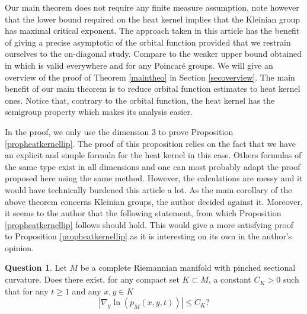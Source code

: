 \documentclass[JEP,XML,SOM,Unicode,NoFloatCountersInSection,published]{cedram}
\theoremstyle{plain}
\theoremstyle{definition}
\newtheorem*{question}{Question}
\begin{document}
Our main theorem does not require any finite measure assumption, note however that the lower bound required on the heat kernel implies that the Kleinian group has maximal critical exponent. The approach taken in this article has the benefit of giving a precise asymptotic of the orbital function provided that we restrain ourselves to the on-diagonal study. Compare to the weaker upper bound obtained in \cite[Th.\,1.2]{artmoiheatcounting1} which is valid everywhere and for any Poincaré groups. We will give an overview of the proof of Theorem \ref{maintheo} in Section \ref{secoverview}. The main benefit of our main theorem is to reduce orbital function estimates to heat kernel ones. Notice that, contrary to the orbital function, the heat kernel has the semigroup property which makes its analysis easier.

In the proof, we only use the dimension 3 to prove Proposition \ref{propheatkernellip}. The proof of this proposition relies on the fact that we have an explicit and simple formula for the heat kernel in this case. Others formulas of the same type exist in all dimensions and one can most probably adapt the proof proposed here using the same method. However, the calculations are messy and it would have technically burdened this article a lot. As the main corollary of the above theorem concerns Kleinian groups, the author decided against it. Moreover, it seems to the author that the following statement, from which Proposition \ref{propheatkernellip} follows should hold. This would give a more satisfying proof to Proposition \ref{propheatkernellip} as it is interesting on its own in the author's opinion.

\begin{question}
Let $M$ be a complete Riemannian manifold with pinched sectional curvature. Does there exist, for any compact set $K \subset M$, a constant $C_K > 0$ such that for any $t \ge 1$ and any $x, y \in K$
\[
| \nabla_y \ln (p_M(x,y,t)) | \le C_K ?
\]
\end{question}
\end{document}
